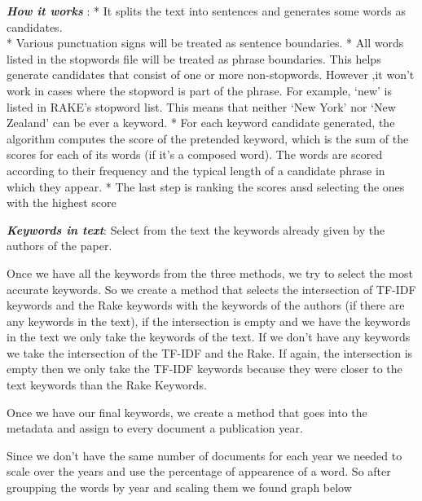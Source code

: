 \documentclass[journal,twocolumn]{IEEEtran}
\begin{document}
\textbf{\emph{How it works}} : * It splits the text into sentences and
generates some words as candidates.\\
* Various punctuation signs will be treated as sentence boundaries. *
All words listed in the stopwords file will be treated as phrase
boundaries. This helps generate candidates that consist of one or more
non-stopwords. However ,it won't work in cases where the stopword is
part of the phrase. For example, `new' is listed in RAKE's stopword
list. This means that neither `New York' nor `New Zealand' can be ever a
keyword. * For each keyword candidate generated, the algorithm computes
the score of the pretended keyword, which is the sum of the scores for
each of its words (if it's a composed word). The words are scored
according to their frequency and the typical length of a candidate
phrase in which they appear. * The last step is ranking the scores ansd
selecting the ones with the highest score

    \textbf{\emph{Keywords in text}}: Select from the text the keywords
already given by the authors of the paper.

    Once we have all the keywords from the three methods, we try to select
the most accurate keywords. So we create a method that selects the
intersection of TF-IDF keywords and the Rake keywords with the keywords
of the authors (if there are any keywords in the text), if the
intersection is empty and we have the keywords in the text we only take
the keywords of the text. If we don't have any keywords we take the
intersection of the TF-IDF and the Rake. If again, the intersection is
empty then we only take the TF-IDF keywords because they were closer to
the text keywords than the Rake Keywords.

    Once we have our final keywords, we create a method that goes into the
metadata and assign to every document a publication year.


    Since we don't have the same number of documents for each year we needed
to scale over the years and use the percentage of appearence of a word.
So after groupping the words by year and scaling them we found graph
below


    \begin{figure}
        \begin{center}\end{center}
        \caption{}
        \label{}
    \end{figure}
    
\end{document}
